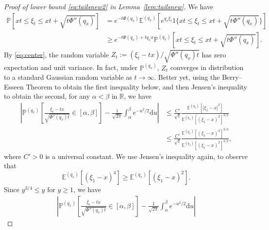 \documentclass[a4,12pt]{amsart}
\numberwithin{equation}{section}
\begin{document}
\begin{appendix}
\begin{proof}[Proof of lower bound \eqref{eq:tailsnew2} in Lemma~\ref{lem:tailsnew}]
We have 
\begin{align} \label{eq:gto}
\mathbb{P}[ xt \leq \xi_t \leq xt + \sqrt{t \Phi''(q_x)} ] &= e^{ - t \Phi(q_x)} \mathbb{E}^{(q_x)}\left[ e^{ q_x \xi_t } \mathrm{1}\{ xt \leq \xi_t \leq xt + \sqrt{t \Phi''(q_x)}  \} \right] \nonumber \\
&\geq e^{ - t \Phi(q_x) + t q_x x } \mathbb{P}^{(q_x)}[ xt \leq \xi_t \leq xt + \sqrt{t \Phi''(q_x)} ].
\end{align}
\color{black}
	By \eqref{eq:center}, the random variable $Z_t := (\xi_t - tx)/ \sqrt{\Phi''(q_x)t }$ has zero expectation and unit variance. 
	In fact, under $\mathbb{P}^{(q_x)}$, $Z_t$ converges in distribution to a standard Gaussian random variable as $t \to \infty$. 
	Better yet, using the Berry--Esseen Theorem to obtain the first inequality below, 
	and then Jensen's inequality to obtain the second, for any $\alpha < \beta$ in $\mathbb{R}$, we have 
	\begin{align*}
		\left| \mathbb{P}^{(q_x)} \left[\frac{\xi_t - tx }{ \sqrt{\Phi''(q_x)t } } \in [\alpha,\beta] \right] 
			- \frac{1}{\sqrt{2\pi}} \int_\alpha^\beta e^{-u^2/2} \mathrm{d} u \right| 
		&\leq \frac{C'}{\sqrt{t}} 
		\frac{ \mathbb{E}^{(q_x)}\left[ |\xi_1 - x|^3 \right] }{\mathbb{E}^{(q_x)}\left[ (\xi_1 - x)^2 \right]^{3/2} }\\
		&\leq \frac{C'}{\sqrt{t}} 
		\frac{ \mathbb{E}^{(q_x)}\left[ (\xi_1 - x)^4 \right]^{3/4} }{\mathbb{E}^{(q_x)}\left[ (\xi_1 - x)^2 \right]^{3/2} },
	\end{align*}
	where $C'>0$ is a universal constant. We use Jensen's inequality again, to observe that 
	$$
		\mathbb{E}^{(q_x)}\left[ (\xi_1 - x)^4 \right] \geq \mathbb{E}^{(q_x)}\left[ (\xi_1 - x)^2\right].
	$$
	Since $y^{3/4}\leq y$ for $y\geq 1$, we have  
	\begin{align*}
		\left| \mathbb{P}^{(q_x)} \left[\frac{\xi_t - tx }{ \sqrt{\Phi''(q_x)t } } \in [\alpha,\beta] \right] 
		- \frac{1}{\sqrt{2\pi}} \int_\alpha^\beta e^{-u^2/2} \mathrm{d} u \right| 

\end{align*}
\end{proof}
\end{appendix}
\end{document}
